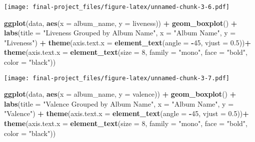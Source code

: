 \documentclass[
]{article}
\newenvironment{Shaded}{\begin{snugshade}}{\end{snugshade}}
\newcommand{\AttributeTok}[1]{\textcolor[rgb]{0.13,0.29,0.53}{#1}}
\newcommand{\DecValTok}[1]{\textcolor[rgb]{0.00,0.00,0.81}{#1}}
\newcommand{\FloatTok}[1]{\textcolor[rgb]{0.00,0.00,0.81}{#1}}
\newcommand{\FunctionTok}[1]{\textcolor[rgb]{0.13,0.29,0.53}{\textbf{#1}}}
\newcommand{\NormalTok}[1]{#1}
\newcommand{\SpecialCharTok}[1]{\textcolor[rgb]{0.81,0.36,0.00}{\textbf{#1}}}
\newcommand{\StringTok}[1]{\textcolor[rgb]{0.31,0.60,0.02}{#1}}
\begin{document}
\texttt{[image: final-project\_files/figure-latex/unnamed-chunk-3-6.pdf]}

\begin{Shaded}
\begin{Highlighting}[]
\FunctionTok{ggplot}\NormalTok{(data, }\FunctionTok{aes}\NormalTok{(}\AttributeTok{x =}\NormalTok{ album\_name, }\AttributeTok{y =}\NormalTok{ liveness)) }\SpecialCharTok{+}
  \FunctionTok{geom\_boxplot}\NormalTok{() }\SpecialCharTok{+}
  \FunctionTok{labs}\NormalTok{(}\AttributeTok{title =} \StringTok{"Liveness Grouped by Album Name"}\NormalTok{, }
       \AttributeTok{x =} \StringTok{"Album Name"}\NormalTok{, }
       \AttributeTok{y =} \StringTok{"Liveness"}\NormalTok{) }\SpecialCharTok{+}
  \FunctionTok{theme}\NormalTok{(}\AttributeTok{axis.text.x =} \FunctionTok{element\_text}\NormalTok{(}\AttributeTok{angle =} \SpecialCharTok{{-}}\DecValTok{45}\NormalTok{, }\AttributeTok{vjust =} \FloatTok{0.5}\NormalTok{))}\SpecialCharTok{+}
  \FunctionTok{theme}\NormalTok{(}\AttributeTok{axis.text.x =} \FunctionTok{element\_text}\NormalTok{(}\AttributeTok{size =} \DecValTok{8}\NormalTok{, }\AttributeTok{family =} \StringTok{"mono"}\NormalTok{, }\AttributeTok{face =} \StringTok{"bold"}\NormalTok{, }\AttributeTok{color =} \StringTok{"black"}\NormalTok{))}
\end{Highlighting}
\end{Shaded}

\texttt{[image: final-project\_files/figure-latex/unnamed-chunk-3-7.pdf]}

\begin{Shaded}
\begin{Highlighting}[]
\FunctionTok{ggplot}\NormalTok{(data, }\FunctionTok{aes}\NormalTok{(}\AttributeTok{x =}\NormalTok{ album\_name, }\AttributeTok{y =}\NormalTok{ valence)) }\SpecialCharTok{+}
  \FunctionTok{geom\_boxplot}\NormalTok{() }\SpecialCharTok{+}
  \FunctionTok{labs}\NormalTok{(}\AttributeTok{title =} \StringTok{"Valence Grouped by Album Name"}\NormalTok{, }
       \AttributeTok{x =} \StringTok{"Album Name"}\NormalTok{, }
       \AttributeTok{y =} \StringTok{"Valence"}\NormalTok{) }\SpecialCharTok{+}
  \FunctionTok{theme}\NormalTok{(}\AttributeTok{axis.text.x =} \FunctionTok{element\_text}\NormalTok{(}\AttributeTok{angle =} \SpecialCharTok{{-}}\DecValTok{45}\NormalTok{, }\AttributeTok{vjust =} \FloatTok{0.5}\NormalTok{))}\SpecialCharTok{+}
  \FunctionTok{theme}\NormalTok{(}\AttributeTok{axis.text.x =} \FunctionTok{element\_text}\NormalTok{(}\AttributeTok{size =} \DecValTok{8}\NormalTok{, }\AttributeTok{family =} \StringTok{"mono"}\NormalTok{, }\AttributeTok{face =} \StringTok{"bold"}\NormalTok{, }\AttributeTok{color =} \StringTok{"black"}\NormalTok{))}
\end{Highlighting}
\end{Shaded}
\end{document}
